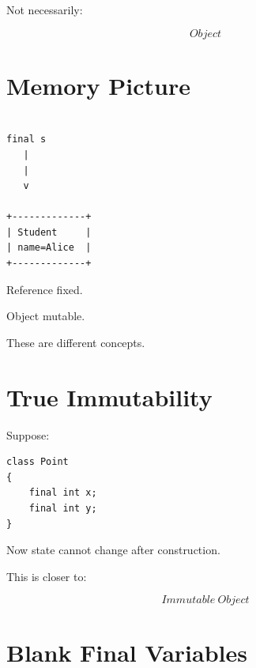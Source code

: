 \documentclass[11pt,a4paper]{book}
\begin{document}

Not necessarily:

\[
Object
\]


\section{Memory Picture}

\begin{verbatim}

final s
   |
   |
   v

+-------------+
| Student     |
| name=Alice  |
+-------------+

\end{verbatim}


Reference fixed.


Object mutable.


These are different concepts.


\section{True Immutability}

Suppose:

\begin{verbatim}
class Point
{
    final int x;
    final int y;
}
\end{verbatim}


Now state cannot change after construction.


This is closer to:

\[
Immutable\ Object
\]


\section{Blank Final Variables}
\end{document}
